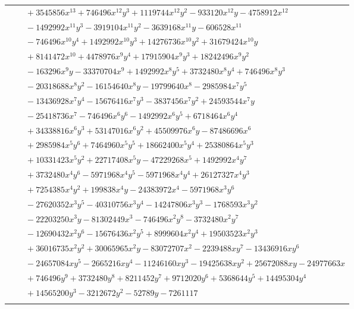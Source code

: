 \documentclass[11pt]{article}
\begin{document}
\begin{longtable}{@{}ll@{}}
 & $\quad +3545856x^{13}+746496x^{12}y^{3}+1119744x^{12}y^{2}-933120x^{12}y-4758912x^{12}$\\
 & $\quad -1492992x^{11}y^{3}-3919104x^{11}y^{2}-3639168x^{11}y-606528x^{11}$\\
 & $\quad -746496x^{10}y^{4}+1492992x^{10}y^{3}+14276736x^{10}y^{2}+31679424x^{10}y$\\
 & $\quad +8141472x^{10}+4478976x^{9}y^{4}+17915904x^{9}y^{3}+18242496x^{9}y^{2}$\\
 & $\quad -163296x^{9}y-33370704x^{9}+1492992x^{8}y^{5}+3732480x^{8}y^{4}+746496x^{8}y^{3}$\\
 & $\quad -20318688x^{8}y^{2}-16154640x^{8}y-19799640x^{8}-2985984x^{7}y^{5}$\\
 & $\quad -13436928x^{7}y^{4}-15676416x^{7}y^{3}-3837456x^{7}y^{2}+24593544x^{7}y$\\
 & $\quad -25418736x^{7}-746496x^{6}y^{6}-1492992x^{6}y^{5}+6718464x^{6}y^{4}$\\
 & $\quad +34338816x^{6}y^{3}+53147016x^{6}y^{2}+45509976x^{6}y-87486696x^{6}$\\
 & $\quad +2985984x^{5}y^{6}+7464960x^{5}y^{5}+18662400x^{5}y^{4}+25380864x^{5}y^{3}$\\
 & $\quad +10331423x^{5}y^{2}+22717408x^{5}y-47229268x^{5}+1492992x^{4}y^{7}$\\
 & $\quad +3732480x^{4}y^{6}-5971968x^{4}y^{5}-5971968x^{4}y^{4}+26127327x^{4}y^{3}$\\
 & $\quad +7254385x^{4}y^{2}+199838x^{4}y-24383972x^{4}-5971968x^{3}y^{6}$\\
 & $\quad -27620352x^{3}y^{5}-40310756x^{3}y^{4}-14247806x^{3}y^{3}-1768593x^{3}y^{2}$\\
 & $\quad -22203250x^{3}y-81302449x^{3}-746496x^{2}y^{8}-3732480x^{2}y^{7}$\\
 & $\quad -12690432x^{2}y^{6}-15676436x^{2}y^{5}+8999604x^{2}y^{4}+19503523x^{2}y^{3}$\\
 & $\quad +36016735x^{2}y^{2}+30065965x^{2}y-83072707x^{2}-2239488xy^{7}-13436916xy^{6}$\\
 & $\quad -24657084xy^{5}-2665216xy^{4}-11246160xy^{3}-19425638xy^{2}+25672088xy-24977663x$\\
 & $\quad +746496y^{9}+3732480y^{8}+8211452y^{7}+9712020y^{6}+5368644y^{5}+14495304y^{4}$\\
 & $\quad +14565200y^{3}-3212672y^{2}-52789y-7261117$\\
\addlinespace[3pt]
\multicolumn{2}{@{}l}{$i=46$, $m=4$, neighbours $3,10,18,26,59,80,187$}\\

\end{longtable}
\end{document}

